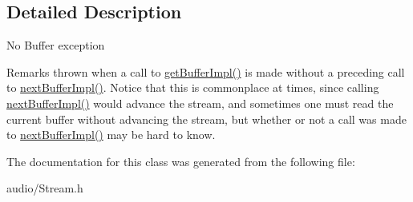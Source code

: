 \subsection{Detailed Description}
No Buffer exception \begin{DoxyRemark}{Remarks}
thrown when a call to \hyperlink{classAudio_1_1Stream_a9e751b39449a3cfe0aa6579cdba43e65}{get\+Buffer\+Impl()} is made without a preceding call to \hyperlink{classAudio_1_1Stream_a3efb4fa10e2a575805d9f8be9a133b6f}{next\+Buffer\+Impl()}. Notice that this is commonplace at times, since calling \hyperlink{classAudio_1_1Stream_a3efb4fa10e2a575805d9f8be9a133b6f}{next\+Buffer\+Impl()} would advance the stream, and sometimes one must read the current buffer without advancing the stream, but whether or not a call was made to \hyperlink{classAudio_1_1Stream_a3efb4fa10e2a575805d9f8be9a133b6f}{next\+Buffer\+Impl()} may be hard to know. 
\end{DoxyRemark}


The documentation for this class was generated from the following file\+:\begin{DoxyCompactItemize}
\item 
audio/Stream.\+h\end{DoxyCompactItemize}
